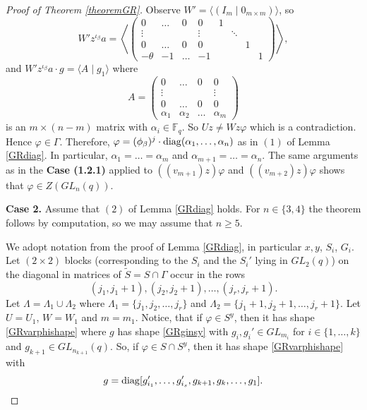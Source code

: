 \begin{proof}[Proof of Theorem {\rm \ref{theoremGR}}]
Observe $W'= \langle (I_m \mid 0_{m \times m}) \rangle$, so 
$$W'z^{\iota_{\beta}}a= \left \langle 
\left(\begin{array}{cccc|cccc}
0 & \ldots & 0 &  0 & 1 & & &  \\
\vdots &  &  & \vdots &   &\ddots & & \\
0 & \ldots & 0 &  0      &  &  & 1 &   \\
- \theta & -1 & \ldots  & -1 &  & & & 1 
\end{array}\right)
\right \rangle,$$
and $W'z^{\iota_{\beta}}a \cdot g = \langle A\mid g_1 \rangle$ where 
$$A=\left(\begin{array}{cccc}
0 & \ldots & 0 &  0   \\
\vdots &  &  & \vdots \\
0 & \ldots & 0 &  0   \\
\alpha_1 & \alpha_2 & \ldots  & \alpha_{m} 
\end{array}\right)
$$ is an $m \times (n-m)$ matrix with $\alpha_i \in \mathbb{F}_q.$ So $Uz \ne Wz \varphi$ which is a contradiction. Hence $\varphi \in \Gamma.$
Therefore, $\varphi = (\phi_{\beta})^j \cdot \mathrm{diag}(\alpha_1, \ldots, \alpha_n)$ as in $(1)$ of Lemma
\ref{GRdiag}. In particular, $\alpha_1 = \ldots = \alpha_m$ and $\alpha_{m+1}= \ldots = \alpha_n.$ The same arguments as in the {\bf Case (1.2.1)} applied to $((v_{m+1})z) \varphi$ and $((v_{m+2})z) \varphi$ shows that $\varphi \in Z(GL_n(q)).$

\bigskip

{\bf Case 2.}  Assume that $(2)$ of Lemma \ref{GRdiag} holds.
 For $n \in \{3,4\}$ the theorem follows by computation, so  we may assume that $n \ge 5$.


We adopt notation from the proof of Lemma \ref{GRdiag}, in particular $x,y$, $S_i$, $G_i$.
Let $(2 \times 2)$ blocks (corresponding to the $S_i$ and the $S_i'$ lying in $GL_2(q)$) on the diagonal in matrices of $\tilde{S}=S \cap \Gamma$ occur in the rows $$(j_1, j_1+1), (j_2, j_2 +1), \ldots, (j_r, j_r+1).$$ Let $\Lambda=\Lambda_1 \cup \Lambda_2$ where 
$\Lambda_1=\{j_1, j_2, \ldots, j_r\}$ and $\Lambda_2=\{j_1+1, j_2+1, \ldots, j_r+1\}.$
 Let $U=U_1$, $W=W_1$ and $m=m_1.$  
 Notice, that if $\varphi \in S^y$, then it has shape \eqref{GRvarphishape} where $g$ has shape \eqref{GRginsy} with $g_i, g_i' \in GL_{m_i}$ for $i \in \{1, \ldots, k\}$ and $g_{k+1} \in GL_{n_{k+1}}(q).$ So, if $\varphi \in S \cap S^y$, then it has shape \eqref{GRvarphishape} with 
 \begin{equation}
 \label{GRgdiagcase2}
 g = \mathrm{diag}[g_{i_1}', \ldots, g_{i_s}', g_{k+1}, g_k, \ldots, g_1].
 \end{equation}
 

\end{proof}
